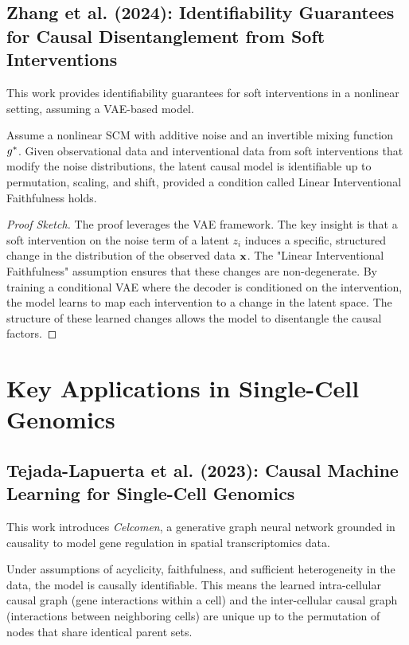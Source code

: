 \documentclass{article}
\begin{document}
\subsection{Zhang et al. (2024): Identifiability Guarantees for Causal Disentanglement from Soft Interventions}
This work provides identifiability guarantees for soft interventions in a nonlinear setting, assuming a VAE-based model.

\begin{theorem}
Assume a nonlinear SCM with additive noise and an invertible mixing function $g^*$. Given observational data and interventional data from soft interventions that modify the noise distributions, the latent causal model is identifiable up to permutation, scaling, and shift, provided a condition called Linear Interventional Faithfulness holds.
\end{theorem}
\begin{proof}[Proof Sketch]
The proof leverages the VAE framework. The key insight is that a soft intervention on the noise term of a latent $z_i$ induces a specific, structured change in the distribution of the observed data ${\mathbf{x}}$. The "Linear Interventional Faithfulness" assumption ensures that these changes are non-degenerate. By training a conditional VAE where the decoder is conditioned on the intervention, the model learns to map each intervention to a change in the latent space. The structure of these learned changes allows the model to disentangle the causal factors.
\end{proof}

\section{Key Applications in Single-Cell Genomics}

\subsection{Tejada-Lapuerta et al. (2023): Causal Machine Learning for Single-Cell Genomics}
This work introduces \textit{Celcomen}, a generative graph neural network grounded in causality to model gene regulation in spatial transcriptomics data.

\begin{theorem}
Under assumptions of acyclicity, faithfulness, and sufficient heterogeneity in the data, the model is causally identifiable. This means the learned intra-cellular causal graph (gene interactions within a cell) and the inter-cellular causal graph (interactions between neighboring cells) are unique up to the permutation of nodes that share identical parent sets.
\end{theorem}
\end{document}
